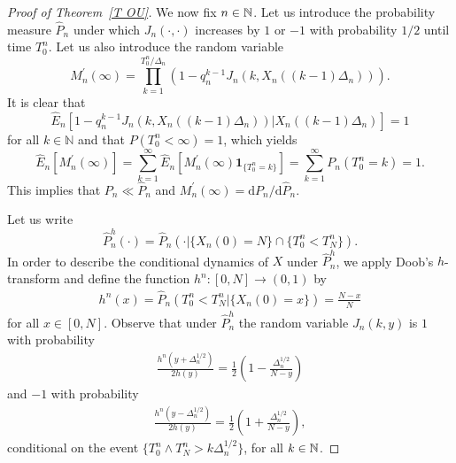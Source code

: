 \begin{proof}[Proof of Theorem~\ref{T OU}]
We now fix $n \in \mathbb{N}$.
Let us introduce the probability measure $\widehat{P}_{n}$ under which $%
J_{n}(\cdot ,\cdot )$ increases by $1$ or $-1$ with probability $1/2$ until
time $T_{0}^{n}$. Let us also introduce the
random variable
\begin{equation*}
M_{n}^{\prime }\left( \infty\right) =\prod_{k=1}^{ T_{0}^{n}/\Delta
_{n}}\left( 1-q_{n}^{k-1}J_{n}\left( k,X_{n}\left( \left( k-1\right) \Delta
_{n}\right) \right) \right).
\end{equation*}%
It is clear that
\begin{equation*}
\widehat{E}_{n}\left[ 1-q_{n}^{k-1}J_{n}\left( k,X_{n}\left( \left(
k-1\right) \Delta _{n}\right) \right) |X_{n}\left( \left( k-1\right) \Delta
_{n}\right) \right] =1
\end{equation*}%
for all $k\in \mathbb{N}$ and that $P(T_{0}^{n}<\infty )=1$, which yields
\begin{equation*}
\widehat{E}_{n}\left[ M_{n}^{\prime }\left( \infty \right) \right]
=\sum_{k=1}^{\infty }\widehat{E}_n\left[ M_{n}^{\prime }\left( \infty
\right) \mathbf{1}_{\{T_{0}^{n}=k\}}\right] =\sum_{k=1}^{\infty }{P}%
_n\left( T_{0}^{n}=k\right) =1.
\end{equation*}%
This implies that $P_n\ll \widehat{P}_n$ and $%
M_{n}^{\prime }\left( \infty \right) ={\mathrm{d}P_n}/{\mathrm{d}\widehat{P%
}_n}$.

Let us write
\begin{equation*}
\widehat{P}^{h}_n(\cdot )=\widehat{P}_n(\cdot | \{X_{n}\left( 0\right) =N\}
\cap \{T_{0}^{n}<T_{N}^{n}\}).
\end{equation*}
In order to describe the conditional dynamics of $X$ under $\widehat{P}^{h}_n
$, we apply Doob's $h$-transform and define the function $h^n:[0,N]
\rightarrow (0,1)$ by
\begin{align*}
h^n\left( x\right) =\widehat{P}_n(T_{0}^{n}<T_N^{n}|\{X_{n}( 0)
=x\})=\frac{N-x}{N}
\end{align*}
for all $x \in [0,N]$. Observe that under $\widehat{P}%
^{h}_n$ the random variable $J_n(k,y)$ is $1$ with probability
\begin{align*}
\frac{h^n(y+\Delta _{n}^{1/2})}{2h(y )}=\frac{1}{2}\left( 1-\frac{\Delta
_{n}^{1/2}}{N-y }\right)
\end{align*}
and $-1$ with probability
\begin{align*}
\frac{h^n(y-\Delta _{n}^{1/2})}{2h(y )}=\frac{1}{2}\left( 1+\frac{\Delta
_{n}^{1/2}}{N-y }\right),
\end{align*}
conditional on the event $\{T_0^n \wedge T_N^n > k \Delta_n^{1/2}\}$, for all $k \in \mathbb{N}$.


\end{proof}
